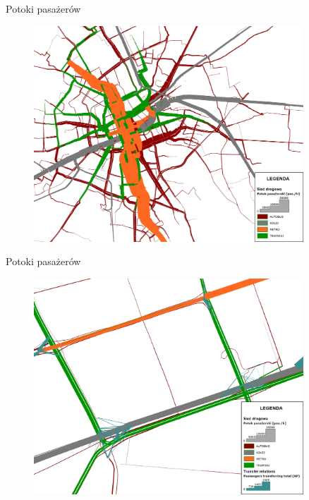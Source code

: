 \documentclass[8pt]{beamer}
\begin{document}
\begin{frame}{Potoki pasażerów}
\begin{figure}\begin{center}
\includegraphics[width=0.9\textwidth]{put_flows2}
 \end{center}  \end{figure} 
\end{frame}

\begin{frame}{Potoki pasażerów}
\begin{figure}\begin{center}
\includegraphics[width=0.9\textwidth]{put_flows3}
 \end{center}  \end{figure} 
\end{frame}
\end{document}
